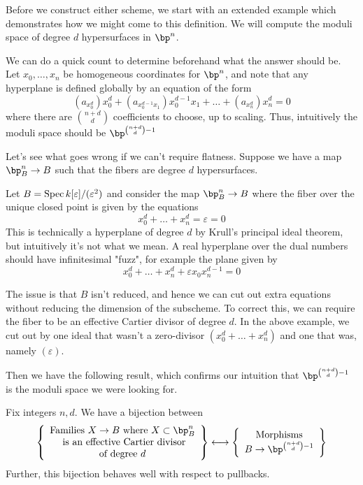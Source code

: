 \documentclass[12pt]{article}
\begin{document}
Before we construct either scheme, we start with an extended example which demonstrates how we might come to this definition. We will compute the moduli space of degree $d$ hypersurfaces in $\bp^n$. 

\begin{rem}
  We can do a quick count to determine beforehand what the answer should be. Let $x_0,\ldots,x_n$ be homogeneous coordinates for $\bp^n$, and note that any hyperplane is defined globally by an equation of the form
  \[(a_{x_0^d}) x_0^d + (a_{x_0^{d-1}x_1}) x_0^{d-1}x_1 + \ldots + (a_{x_n^d})x_n^d = 0\]
  where there are $\binom{n+d}{d}$ coefficients to choose, up to scaling. Thus, intuitively the moduli space should be $\bp^{\binom{n+d}{d} - 1}$
\end{rem}

Let's see what goes wrong if we can't require flatness. Suppose we have a map $\bp^n_B \to B$ such that the fibers are degree $d$ hypersurfaces.

\begin{example}
  Let $B = \operatorname{Spec} k[\varepsilon]/(\varepsilon^2)$ and consider the map $\bp^n_B \to B$ where the fiber over the unique closed point is given by the equations 
  \[x_0^d + \ldots + x_n^d =  \varepsilon = 0\] 
  This is technically a hyperplane of degree $d$ by Krull's principal ideal theorem, but intuitively it's not what we mean. A real hyperplane over the dual numbers should have infinitesimal "fuzz", for example the plane given by 
  \[x_0^d + \ldots + x_n^d + \varepsilon x_0 x_n^{d-1} = 0\]
\end{example}

The issue is that $B$ isn't reduced, and hence we can cut out extra equations without reducing the dimension of the subscheme. To correct this, we can require the fiber to be an effective Cartier divisor of degree $d$. In the above example, we cut out by one ideal that wasn't a zero-divisor $(x_0^d + \ldots + x_n^d)$ and one that was, namely $(\varepsilon)$. 

Then we have the following result, which confirms our intuition that $\bp^{\binom{n+d}{d} - 1}$ is the moduli space we were looking for.

\begin{thm}\label{cartier}
  Fix integers $n,d$. We have a bijection between
  \[\left\{\begin{array}{c}
      \text{Families } X \to B \text{ where }X \subset \bp^n_B \\
       \text{ is an effective Cartier divisor} \\
      \text{of degree }d
  \end{array}\right\} \longleftrightarrow \left\{\begin{array}{c}
      \text{Morphisms}  \\
      B \to \bp^{\binom{n+d}{d} - 1}
  \end{array}\right\}\]
  Further, this bijection behaves well with respect to pullbacks. 
\end{thm}
\end{document}

